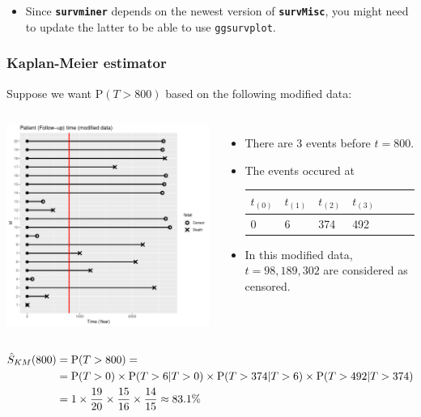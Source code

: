 \documentclass[10pt]{beamer}\usepackage[]{graphicx}\usepackage[]{color}
\newcommand{\pkg}[1]{{\textbf{\texttt{#1}}}}
\newcommand{\code}[1]{{\texttt{#1}}}
\newcommand{\p}{\mathrm{P}}
\newcommand{\Skm}{\hat{S}_{\scriptsize{KM}}}
\begin{document}
\begin{frame}[fragile]
\begin{itemize}
  \item Since \pkg{survminer} depends on the newest version of \pkg{survMisc},
    you might need to update the latter to be able to use \code{ggsurvplot}.
  \end{itemize}
\end{frame}

\begin{frame}
  \frametitle{Kaplan-Meier estimator}
  Suppose we want $\p(T > 800)$ based on the following modified data:
  \begin{columns}
    \includegraphics[scale = .3]{tab1-1-5}
    \begin{itemize}
    \item There are 3 events before $t = 800$.
    \item The events occured at 
      {\scriptsize
      \begin{tabular}{lllllll}
        $t_{(0)}$ & $t_{(1)}$ & $t_{(2)}$ & $t_{(3)}$ \\
        \midrule
        0 & 6 & 374 & 492 \\
      \end{tabular}}
    \item In this modified data, $t = 98, 189, 302$ are considered as censored.
    \end{itemize}
  \end{columns}
  \vspace{-.3cm}
  {\scriptsize
  \begin{align*}
    \Skm(800) &= \p(T > 800) =\\
    &= \p(T > 0) \times \p(T > 6|T > 0) \times \p(T > 374|T > 6) \times \p(T > 492|T > 374) \\
    &=1 \times \frac{19}{20} \times \frac{15}{16} \times \frac{14}{15} \approx 83.1\%
  \end{align*}
  }
\end{frame}
\end{document}
